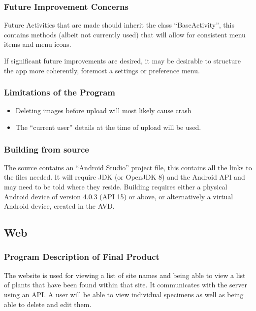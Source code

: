     \subsubsection{Future Improvement Concerns}
        Future Activities that are made should inherit the class ``BaseActivity'', this contains methods (albeit not currently used) that will allow for consistent menu items and menu icons. 

        If significant future improvements are desired, it may be desirable to structure the app more coherently, foremost a settings or preference menu. 

    \subsubsection{Limitations of the Program}
        \begin{itemize}
            \item Deleting images before upload will most likely cause crash
            \item The ``current user'' details at the time of upload will be used.
        \end{itemize}

    \subsubsection{Building from source}
        The source contains an ``Android Studio'' project file, this contains all the links to the files needed. It will require JDK (or OpenJDK 8) and the Android API and may need to be told where they reside. Building requires either a physical Android device of version 4.0.3 (API 15) or above, or alternatively a virtual Android device, created in the AVD.

\subsection{Web}

    \subsubsection{Program Description of Final Product}

        The website is used for viewing a list of site names and being able to view a list of plants that have been found within that site. It communicates with the server using an API. A user will be able to view individual specimens as well as being able to delete and edit them.

